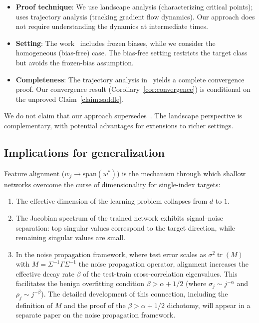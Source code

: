 \documentclass[11pt]{amsart}
\theoremstyle{definition}
\newcommand{\spn}{\mathrm{span}}
\DeclareMathOperator{\tr}{tr}
\begin{document}
\begin{itemize}
\item \textbf{Proof technique}: We use landscape analysis (characterizing critical points); \cite{bietti2022} uses trajectory analysis (tracking gradient flow dynamics). Our approach does not require understanding the dynamics at intermediate times.

\item \textbf{Setting}: The work~\cite{bietti2022} includes frozen biases, while we consider the homogeneous (bias-free) case. The bias-free setting restricts the target class but avoids the frozen-bias assumption.

\item \textbf{Completeness}: The trajectory analysis in~\cite{bietti2022} yields a complete convergence proof. Our convergence result (Corollary~\ref{cor:convergence}) is conditional on the unproved Claim~\ref{claim:saddle}.
\end{itemize}

We do not claim that our approach supersedes~\cite{bietti2022}. The landscape perspective is complementary, with potential advantages for extensions to richer settings.

\subsection{Implications for generalization}

Feature alignment ($w_j \to \spn(w^*)$) is the mechanism through which shallow networks overcome the curse of dimensionality for single-index targets:

\begin{enumerate}[label=(\roman*)]
\item The effective dimension of the learning problem collapses from $d$ to $1$.

\item The Jacobian spectrum of the trained network exhibits signal--noise separation: top singular values correspond to the target direction, while remaining singular values are small.

\item In the noise propagation framework, where test error scales as $\sigma^2 \tr(M)$ with $M = \Sigma^{-1}\Gamma\Sigma^{-1}$ the noise propagation operator, alignment increases the effective decay rate $\beta$ of the test-train cross-correlation eigenvalues. This facilitates the benign overfitting condition $\beta > \alpha + 1/2$ (where $\sigma_j \sim j^{-\alpha}$ and $\rho_j \sim j^{-\beta}$). The detailed development of this connection, including the definition of $M$ and the proof of the $\beta > \alpha + 1/2$ dichotomy, will appear in a separate paper on the noise propagation framework.
\end{enumerate}
\end{document}
